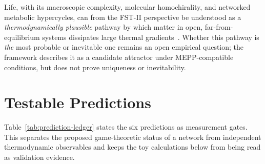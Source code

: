 \documentclass[12pt,a4paper]{article}
\theoremstyle{remark}
\begin{document}
Life, with its macroscopic complexity, molecular homochirality, and networked metabolic hypercycles, can from the FST-II perspective be understood as a \emph{thermodynamically plausible} pathway by which matter in open, far-from-equilibrium systems dissipates large thermal gradients~\citep{Bioenergetics}. Whether this pathway is \emph{the} most probable or inevitable one remains an open empirical question; the framework describes it as a candidate attractor under MEPP-compatible conditions, but does not prove uniqueness or inevitability.

\section{Testable Predictions}
\label{sec:predictions}

Table~\ref{tab:prediction-ledger} states the six predictions as measurement gates. This separates the proposed game-theoretic status of a network from independent thermodynamic observables and keeps the toy calculations below from being read as validation evidence.
\end{document}
